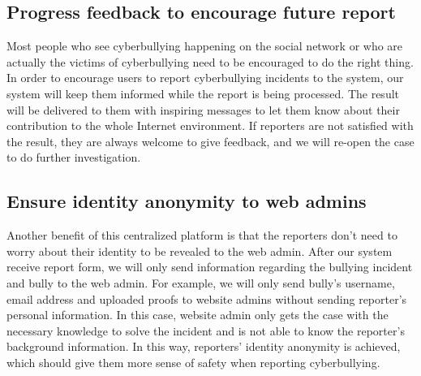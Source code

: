 \subsection{Progress feedback to encourage future report}
Most people who see cyberbullying happening on the social network or who are actually the victims of cyberbullying need to be encouraged to do the right thing. In order to encourage users to report cyberbullying incidents to the system, our system will keep them informed while the report is being processed. The result will be delivered to them with inspiring messages to let them know about their contribution to the whole Internet environment. If reporters are not satisfied with the result, they are always welcome to give feedback, and we will re-open the case to do further investigation. 

\subsection{Ensure identity anonymity to web admins}
Another benefit of this centralized platform is that the reporters don’t need to worry about their identity to be revealed to the web admin. After our system receive report form, we will only send information regarding the bullying incident and bully to the web admin. For example, we will only send bully’s username, email address and uploaded proofs to website admins without sending reporter’s personal information. In this case, website admin only gets the case with the necessary knowledge to solve the incident and is not able to know the reporter’s background information. In this way, reporters’ identity anonymity is achieved, which should give them more sense of safety when reporting cyberbullying.

